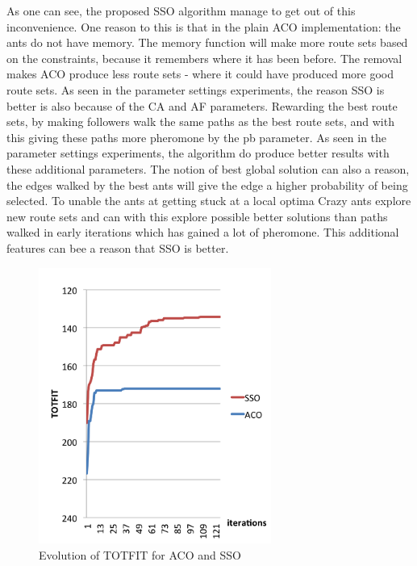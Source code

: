 As one can see, the proposed SSO algorithm manage to get out of this inconvenience. One reason to this is that in the plain ACO implementation: the ants do not have memory. The memory function will make more route sets based on the constraints, because it remembers where it has been before. The removal makes ACO produce less route sets - where it could have produced more good route sets. As seen in the parameter settings experiments, the reason SSO is better is also because of the CA and AF parameters. Rewarding the best route sets, by making followers walk the same paths as the best route sets, and with this giving these paths more pheromone by the pb parameter. As seen in the parameter settings experiments, the algorithm do produce better results with these additional parameters. The notion of best global solution can also a reason, the edges walked by the best ants will give the edge a higher probability of being selected. To unable the ants at getting stuck at a local optima Crazy ants explore new route sets and can with this explore possible better solutions than paths walked in early iterations which has gained a lot of pheromone. This additional features can bee a reason that SSO is better. 

 \begin{figure}[H]
    \begin{center}
    \includegraphics[width=3in]{assets/acovsssoNEW.png}
    \end{center}
    \caption{Evolution of TOTFIT for ACO and SSO }
    \label{fig:acovssso} 
\end{figure}

